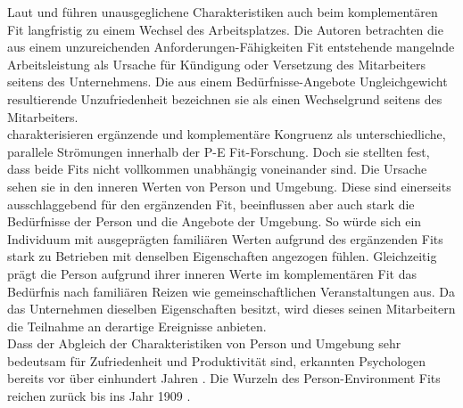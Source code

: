 Laut \textcite[S. 9ff.]{workAdjustment:1964} und \textcite{wanous:1992} führen unausgeglichene Charakteristiken auch beim komplementären Fit langfristig zu einem Wechsel des Arbeitsplatzes. Die Autoren betrachten die aus einem unzureichenden Anforderungen-Fähigkeiten Fit entstehende mangelnde Arbeitsleistung als Ursache für Kündigung oder Versetzung des Mitarbeiters seitens des Unternehmens. Die aus einem Bedürfnisse-Angebote Ungleichgewicht resultierende Unzufriedenheit bezeichnen sie als einen Wechselgrund seitens des Mitarbeiters.\\
\textcite[S. 1ff.]{edwards:2004} charakterisieren ergänzende und komplementäre Kongruenz als unterschiedliche, parallele Strömungen innerhalb der P-E Fit-Forschung. Doch sie stellten fest, dass beide Fits nicht vollkommen unabhängig voneinander sind. Die Ursache sehen sie in den inneren Werten von Person und Umgebung. Diese sind einerseits ausschlaggebend für den ergänzenden Fit, beeinflussen aber auch stark die Bedürfnisse der Person und die Angebote der Umgebung. So würde sich ein Individuum mit ausgeprägten familiären Werten aufgrund des ergänzenden Fits stark zu Betrieben mit denselben Eigenschaften angezogen fühlen. Gleichzeitig prägt die Person aufgrund ihrer inneren Werte im komplementären Fit das Bedürfnis nach familiären Reizen wie gemeinschaftlichen Veranstaltungen aus. Da das Unternehmen dieselben Eigenschaften besitzt, wird dieses seinen Mitarbeitern die Teilnahme an derartige Ereignisse anbieten.\\
Dass der Abgleich der Charakteristiken von Person und Umgebung sehr bedeutsam für Zufriedenheit und Produktivität sind, erkannten Psychologen bereits vor über einhundert Jahren \cite[S. 5ff.]{parsons:1909}. Die Wurzeln des Person-Environment Fits reichen zurück bis ins Jahr 1909 \cite[S. 1]{su:2015}.

